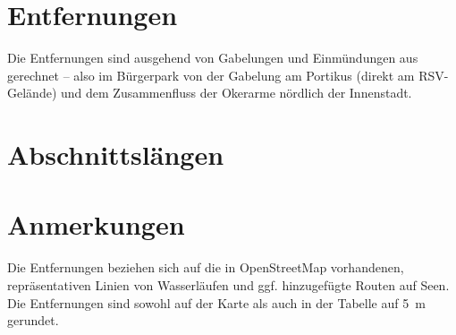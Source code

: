 \documentclass{article}
\begin{document}
    \section*{Entfernungen} Die Entfernungen sind ausgehend von Gabelungen und
    Einmündungen aus gerechnet -- also im Bürgerpark von der Gabelung am
    Portikus (direkt am RSV-Gelände) und dem Zusammenfluss der Okerarme nördlich
    der Innenstadt. \\
    \begin{center}
    \end{center}
    
    \section*{Abschnittslängen}
    
    \begin{center}
    \end{center}    
    
    \section*{Anmerkungen}
    Die Entfernungen beziehen sich auf die in OpenStreetMap vorhandenen,
    repräsentativen Linien von Wasserläufen und ggf. hinzugefügte Routen auf
    Seen. Die Entfernungen sind sowohl auf der Karte als auch in der Tabelle auf 5~m gerundet.    

    \listoffigures
    
\end{document}
